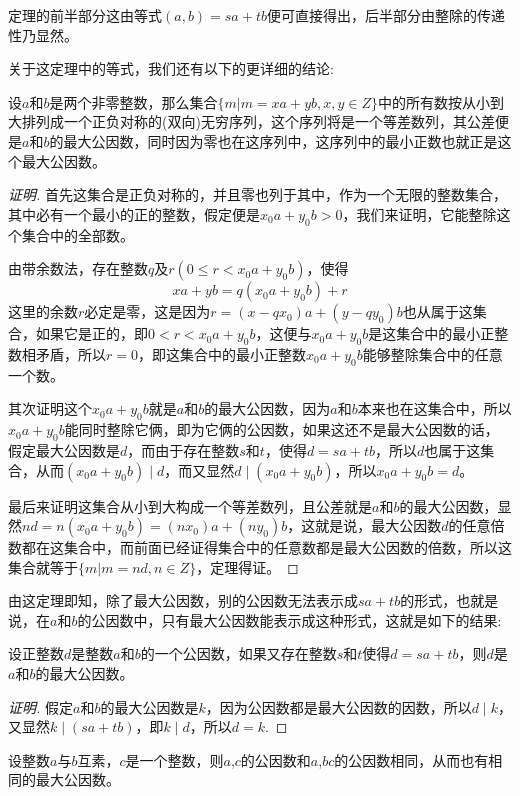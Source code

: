 定理的前半部分这由等式$(a,b)=sa+tb$便可直接得出，后半部分由整除的传递性乃显然。


关于这定理中的等式，我们还有以下的更详细的结论:
\begin{theorem}
  设$a$和$b$是两个非零整数，那么集合$\{m|m=xa+yb, x,y \in Z \}$中的所有数按从小到大排列成一个正负对称的(双向)无穷序列，这个序列将是一个等差数列，其公差便是$a$和$b$的最大公因数，同时因为零也在这序列中，这序列中的最小正数也就正是这个最大公因数。
\end{theorem}

\begin{proof}[证明]
  首先这集合是正负对称的，并且零也列于其中，作为一个无限的整数集合，其中必有一个最小的正的整数，假定便是$x_0a+y_0b>0$，我们来证明，它能整除这个集合中的全部数。

  由带余数法，存在整数$q$及$r(0 \leqslant r < x_0a+y_0b)$，使得
  \[ xa+yb = q(x_0a+y_0b) + r \]
  这里的余数$r$必定是零，这是因为$r=(x-qx_0)a+(y-qy_0)b$也从属于这集合，如果它是正的，即$0 < r < x_0a+y_0b$，这便与$x_0a+y_0b$是这集合中的最小正整数相矛盾，所以$r=0$，即这集合中的最小正整数$x_0a+y_0b$能够整除集合中的任意一个数。

  其次证明这个$x_0a+y_0b$就是$a$和$b$的最大公因数，因为$a$和$b$本来也在这集合中，所以$x_0a+y_0b$能同时整除它俩，即为它俩的公因数，如果这还不是最大公因数的话，假定最大公因数是$d$，而由于存在整数$s$和$t$，使得$d=sa+tb$，所以$d$也属于这集合，从而$(x_0a+y_0b) \mid d$，而又显然$d \mid (x_0a+y_0b)$，所以$x_0a+y_0b=d$。

  最后来证明这集合从小到大构成一个等差数列，且公差就是$a$和$b$的最大公因数，显然$nd=n(x_0a+y_0b)=(nx_0)a+(ny_0)b$，这就是说，最大公因数$d$的任意倍数都在这集合中，而前面已经证得集合中的任意数都是最大公因数的倍数，所以这集合就等于$\{m | m=nd, n\in Z \}$，定理得证。
\end{proof}

由这定理即知，除了最大公因数，别的公因数无法表示成$sa+tb$的形式，也就是说，在$a$和$b$的公因数中，只有最大公因数能表示成这种形式，这就是如下的结果:
\begin{theorem}
  设正整数$d$是整数$a$和$b$的一个公因数，如果又存在整数$s$和$t$使得$d=sa+tb$，则$d$是$a$和$b$的最大公因数。
\end{theorem}

\begin{proof}[证明]
  假定$a$和$b$的最大公因数是$k$，因为公因数都是最大公因数的因数，所以$d \mid k$，又显然$k \mid (sa+tb)$，即$k \mid d$，所以$d=k$.
\end{proof}

\begin{theorem}
  \label{theorem:a-prime-b--a-c--a--bc}
  设整数$a$与$b$互素，$c$是一个整数，则$a$,$c$的公因数和$a$,$bc$的公因数相同，从而也有相同的最大公因数。
\end{theorem}

